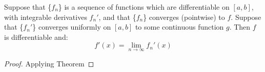 \begin{theorem}
    Suppose that \{$f_n$\} is a sequence of functions which are differentiable on $[a,b]$, with integrable derivatives $f_n'$, and that \{$f_n$\} converges (pointwise) to $f$. Suppose that \{$f_n'$\} converges uniformly on $[a,b]$ to some continuous function $g$. Then $f$ is differentiable and: 
    $$f'(x) = \lim_{n\to \infty}f_n'(x)$$
\end{theorem}
\begin{proof}
    Applying Theorem
\end{proof}
